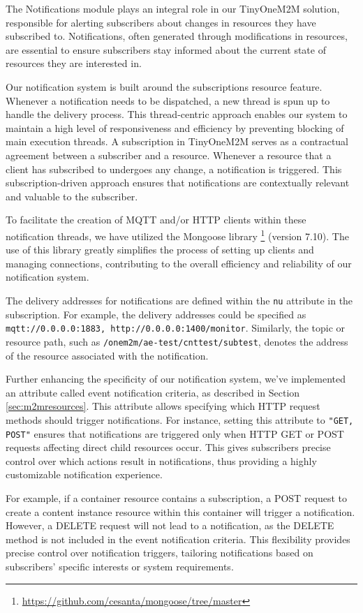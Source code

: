 \documentclass[a4paper,fleqn]{cas-dc}
\begin{document}
The Notifications module plays an integral role in our TinyOneM2M solution, responsible for alerting subscribers about changes in resources they have subscribed to. Notifications, often generated through modifications in resources, are essential to ensure subscribers stay informed about the current state of resources they are interested in.

Our notification system is built around the subscriptions resource feature. Whenever a notification needs to be dispatched, a new thread is spun up to handle the delivery process. This thread-centric approach enables our system to maintain a high level of responsiveness and efficiency by preventing blocking of main execution threads. A subscription in TinyOneM2M serves as a contractual agreement between a subscriber and a resource. Whenever a resource that a client has subscribed to undergoes any change, a notification is triggered. This subscription-driven approach ensures that notifications are contextually relevant and valuable to the subscriber.

To facilitate the creation of MQTT and/or HTTP clients within these notification threads, we have utilized the Mongoose library \footnote{\url{https://github.com/cesanta/mongoose/tree/master}} (version 7.10). The use of this library greatly simplifies the process of setting up clients and managing connections, contributing to the overall efficiency and reliability of our notification system.

The delivery addresses for notifications are defined within the \texttt{nu} attribute in the subscription. For example, the delivery addresses could be specified as \texttt{mqtt://0.0.0.0:1883, http://0.0.0.0:1400/monitor}. Similarly, the topic or resource path, such as \texttt{/onem2m/ae-test/cnttest/subtest}, denotes the address of the resource associated with the notification.

Further enhancing the specificity of our notification system, we've implemented an attribute called event notification criteria, as described in Section \ref{sec:m2mresources}. This attribute allows specifying which HTTP request methods should trigger notifications. For instance, setting this attribute to \texttt{"GET, POST"} ensures that notifications are triggered only when HTTP GET or POST requests affecting direct child resources occur. This gives subscribers precise control over which actions result in notifications, thus providing a highly customizable notification experience. 

For example, if a container resource contains a subscription, a POST request to create a content instance resource within this container will trigger a notification. However, a DELETE request will not lead to a notification, as the DELETE method is not included in the event notification criteria. This flexibility provides precise control over notification triggers, tailoring notifications based on subscribers' specific interests or system requirements.
\end{document}

